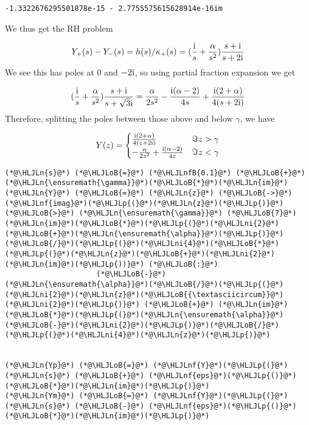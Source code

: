 \documentclass[12pt,landscape]{article}
\newcommand{\HLJLn}[1]{#1}
\newcommand{\HLJLnf}[1]{\textcolor[RGB]{66,102,213}{#1}}
\newcommand{\HLJLnfB}[1]{\textcolor[RGB]{59,151,46}{#1}}
\newcommand{\HLJLni}[1]{\textcolor[RGB]{59,151,46}{#1}}
\newcommand{\HLJLoB}[1]{\textcolor[RGB]{102,102,102}{\textbf{#1}}}
\newcommand{\HLJLp}[1]{#1}
\def\I{ {\rm i} }
\begin{document}
{\begin{lstlisting}
-1.3322676295501878e-15 - 2.7755575615628914e-16im
\end{lstlisting}


We thus get the RH problem

\[
Y_+(s) - Y_-(s) = h(s)/\kappa_+(s) =  ({\I \over s} + {\alpha \over s^2})  {s + \I  \over s + 2 \I}
\]
We see this has poles at $0$ and $-2 \I$, so using partial fraction expansion we get

\[
({\I \over s} + {\alpha \over s^2})  {s + \I  \over s + \sqrt{3} \I} =
{\alpha \over 2 s^2}- {\I (\alpha-2) \over 4 s}  +{\I (2+\alpha) \over 4 (s+2 \I)}
\]
Therefore, splitting the poles between those above and below $\gamma$, we have

\[
Y(z) = \begin{cases}
 {\I (2+\alpha) \over 4 (z+2 \I)} & \Im z > \gamma \\
-{\alpha \over 2 z^2}+{\I (\alpha-2) \over 4 z} & \Im z < \gamma
\end{cases}
\]

\begin{lstlisting}
(*@\HLJLn{s}@*) (*@\HLJLoB{=}@*) (*@\HLJLnfB{0.1}@*) (*@\HLJLoB{+}@*) (*@\HLJLn{\ensuremath{\gamma}}@*)(*@\HLJLoB{*}@*)(*@\HLJLn{im}@*)
(*@\HLJLn{Y}@*) (*@\HLJLoB{=}@*) (*@\HLJLn{z}@*) (*@\HLJLoB{->}@*) (*@\HLJLnf{imag}@*)(*@\HLJLp{(}@*)(*@\HLJLn{z}@*)(*@\HLJLp{)}@*) (*@\HLJLoB{>}@*) (*@\HLJLn{\ensuremath{\gamma}}@*) (*@\HLJLoB{?}@*) (*@\HLJLn{im}@*)(*@\HLJLoB{*}@*)(*@\HLJLp{(}@*)(*@\HLJLni{2}@*)(*@\HLJLoB{+}@*)(*@\HLJLn{\ensuremath{\alpha}}@*)(*@\HLJLp{)}@*)(*@\HLJLoB{/}@*)(*@\HLJLp{(}@*)(*@\HLJLni{4}@*)(*@\HLJLoB{*}@*)(*@\HLJLp{(}@*)(*@\HLJLn{z}@*)(*@\HLJLoB{+}@*)(*@\HLJLni{2}@*)(*@\HLJLn{im}@*)(*@\HLJLp{))}@*) (*@\HLJLoB{:}@*)
                     (*@\HLJLoB{-}@*) (*@\HLJLn{\ensuremath{\alpha}}@*)(*@\HLJLoB{/}@*)(*@\HLJLp{(}@*)(*@\HLJLni{2}@*)(*@\HLJLn{z}@*)(*@\HLJLoB{{\textasciicircum}}@*)(*@\HLJLni{2}@*)(*@\HLJLp{)}@*) (*@\HLJLoB{+}@*) (*@\HLJLn{im}@*)(*@\HLJLoB{*}@*)(*@\HLJLp{(}@*)(*@\HLJLn{\ensuremath{\alpha}}@*)(*@\HLJLoB{-}@*)(*@\HLJLni{2}@*)(*@\HLJLp{)}@*)(*@\HLJLoB{/}@*)(*@\HLJLp{(}@*)(*@\HLJLni{4}@*)(*@\HLJLn{z}@*)(*@\HLJLp{)}@*)


(*@\HLJLn{Yp}@*) (*@\HLJLoB{=}@*) (*@\HLJLnf{Y}@*)(*@\HLJLp{(}@*)(*@\HLJLn{s}@*) (*@\HLJLoB{+}@*) (*@\HLJLnf{eps}@*)(*@\HLJLp{()}@*)(*@\HLJLoB{*}@*)(*@\HLJLn{im}@*)(*@\HLJLp{)}@*)
(*@\HLJLn{Ym}@*) (*@\HLJLoB{=}@*) (*@\HLJLnf{Y}@*)(*@\HLJLp{(}@*)(*@\HLJLn{s}@*) (*@\HLJLoB{-}@*) (*@\HLJLnf{eps}@*)(*@\HLJLp{()}@*)(*@\HLJLoB{*}@*)(*@\HLJLn{im}@*)(*@\HLJLp{)}@*)


\end{lstlisting}}
\end{document}
